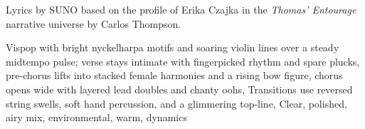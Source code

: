 
\begin{notes}
Lyrics by SUNO based on the profile of Erika Czajka in the \emph{Thomas’ Entourage} narrative universe by Carlos Thompson.
\end{notes}
\begin{style}
Vispop with bright nyckelharpa motifs and soaring violin lines over a steady midtempo pulse; verse stays intimate with fingerpicked rhythm and spare plucks, pre-chorus lifts into stacked female harmonies and a rising bow figure, chorus opens wide with layered lead doubles and chanty oohs, Transitions use reversed string swells, soft hand percussion, and a glimmering top-line, Clear, polished, airy mix, environmental, warm, dynamics
\end{style}
